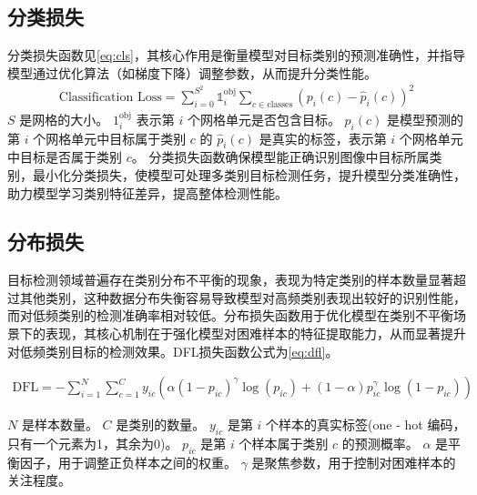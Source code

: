 \subsection{分类损失}
分类损失函数见\ref{eq:cls}，其核心作用是衡量模型对目标类别的预测准确性，并指导模型通过优化算法（如梯度下降）调整参数，从而提升分类性能。
\begin{equation}
  \begin{aligned}
    \text{Classification Loss} = \sum_{i = 0}^{S^2} \mathbb{1}_{i}^{\text{obj}} \sum_{c \in \text{classes}} (p_i(c) - \hat{p}_i(c))^2 \label{eq:cls}
  \end{aligned}
\end{equation}
$S$ 是网格的大小。
$1_{i}^{\text{obj}}$ 表示第 $i$ 个网格单元是否包含目标。
$p_i(c)$ 是模型预测的第 $i$ 个网格单元中目标属于类别 $c$ 的
$\hat{p}_i(c)$ 是真实的标签，表示第 $i$ 个网格单元中目标是否属于类别 $c$。
分类损失函数确保模型能正确识别图像中目标所属类别，最小化分类损失，使模型可处理多类别目标检测任务，提升模型分类准确性，助力模型学习类别特征差异，提高整体检测性能。


\subsection{分布损失}
目标检测领域普遍存在类别分布不平衡的现象，表现为特定类别的样本数量显著超过其他类别，这种数据分布失衡容易导致模型对高频类别表现出较好的识别性能，而对低频类别的检测准确率相对较低。分布损失函数用于优化模型在类别不平衡场景下的表现，其核心机制在于强化模型对困难样本的特征提取能力，从而显著提升对低频类别目标的检测效果。DFL损失函数公式为\ref{eq:dfl}。

\begin{equation}
  \begin{aligned}
    \text{DFL} = - \sum_{i = 1}^{N} \sum_{c = 1}^{C} y_{ic} \left( \alpha (1 - p_{ic})^{\gamma} \log(p_{ic}) + (1 - \alpha) p_{ic}^{\gamma} \log(1 - p_{ic}) \right) \label{eq:dfl}
  \end{aligned}
\end{equation}

$N$ 是样本数量。
$C$ 是类别的数量。
$y_{ic}$ 是第 $i$ 个样本的真实标签(one - hot 编码，只有一个元素为1，其余为0)。
$p_{ic}$ 是第 $i$ 个样本属于类别 $c$ 的预测概率。
$\alpha$ 是平衡因子，用于调整正负样本之间的权重。
$\gamma$ 是聚焦参数，用于控制对困难样本的关注程度。


